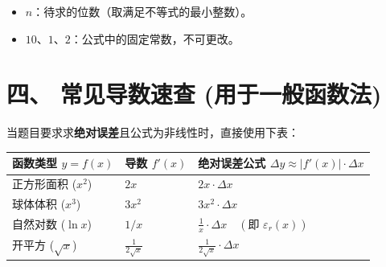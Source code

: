 \documentclass[12pt, a4paper]{article}
\begin{document}
\begin{itemize}
    \item $n$：待求的位数（取满足不等式的最小整数）。
    \item $10$、$1$、$2$：公式中的固定常数，不可更改。
\end{itemize}

\section*{四、 常见导数速查 (用于一般函数法)}
当题目要求求\textbf{绝对误差}且公式为非线性时，直接使用下表：

\begin{table}[h!]
    \centering
    \begin{tabular}{@{} l l l @{}}
        \toprule
        \textbf{函数类型} $y=f(x)$ & \textbf{导数} $f'(x)$ & \textbf{绝对误差公式} $\Delta y \approx |f'(x)| \cdot \Delta x$ \\
        \midrule
        正方形面积 ($x^2$) & $2x$ & $2x \cdot \Delta x$ \\
        球体体积 ($x^3$) & $3x^2$ & $3x^2 \cdot \Delta x$ \\
        自然对数 ($\ln x$) & $1/x$ & $\displaystyle \frac{1}{x} \cdot \Delta x \quad (\text{即 } \varepsilon_r(x))$ \\
        开平方 ($\sqrt{x}$) & $\displaystyle \frac{1}{2\sqrt{x}}$ & $\displaystyle \frac{1}{2\sqrt{x}} \cdot \Delta x$ \\
        \bottomrule
    \end{tabular}
\end{table}
\end{document}
